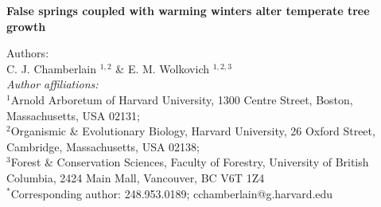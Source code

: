 \documentclass{article}\usepackage[]{graphicx}\usepackage[]{color}
\begin{document}
\noindent \textbf{\Large{False springs coupled with warming winters alter temperate tree growth}}


\noindent Authors:\\
C. J. Chamberlain $^{1,2}$ \& E. M. Wolkovich $^{1,2,3}$
\vspace{2ex}\\
\emph{Author affiliations:}\\
$^{1}$Arnold Arboretum of Harvard University, 1300 Centre Street, Boston, Massachusetts, USA 02131; \\
$^{2}$Organismic \& Evolutionary Biology, Harvard University, 26 Oxford Street, Cambridge, Massachusetts, USA 02138; \\
$^{3}$Forest \& Conservation Sciences, Faculty of Forestry, University of British Columbia, 2424 Main Mall, Vancouver, BC V6T 1Z4\\
\vspace{2ex}
$^*$Corresponding author: 248.953.0189; cchamberlain@g.harvard.edu\\

\renewcommand{\thetable}{\arabic{table}}
\renewcommand{\thefigure}{\arabic{figure}}
\renewcommand{\labelitemi}{$-$}

\end{document}
